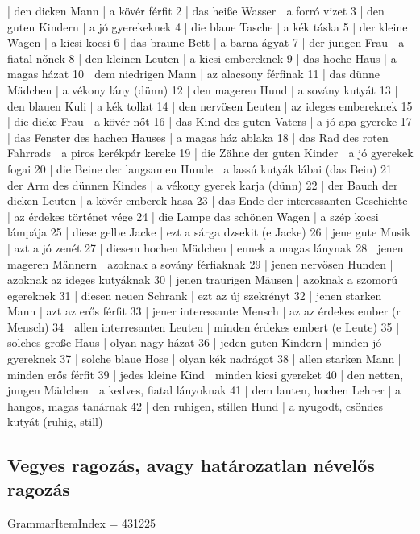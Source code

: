 \documentclass{article}
\newenvironment{desc}{\verbatim}{\endverbatim}
\newenvironment{exmp}{\verbatim}{\endverbatim}
\begin{document}
\begin{exmp}
1 | den dicken Mann | a kövér férfit
2 | das heiße Wasser | a forró vizet
3 | den guten Kindern | a jó gyerekeknek
4 | die blaue Tasche | a kék táska
5 | der kleine Wagen | a kicsi kocsi
6 | das braune Bett | a barna ágyat
7 | der jungen Frau | a fiatal nőnek
8 | den kleinen Leuten | a kicsi embereknek
9 | das hoche Haus | a magas házat
10 | dem niedrigen Mann | az alacsony férfinak
11 | das dünne Mädchen | a vékony lány (dünn)
12 | den mageren Hund | a sovány kutyát
13 | den blauen Kuli | a kék tollat
14 | den nervösen Leuten | az ideges embereknek
15 | die dicke Frau | a kövér nőt
16 | das Kind des guten Vaters | a jó apa gyereke
17 | das Fenster des hachen Hauses | a magas ház ablaka
18 | das Rad des roten Fahrrads | a piros kerékpár kereke
19 | die Zähne der guten Kinder | a jó gyerekek fogai
20 | die Beine der langsamen Hunde | a lassú kutyák lábai (das Bein)
21 | der Arm des dünnen Kindes | a vékony gyerek karja (dünn)
22 | der Bauch der dicken Leuten | a kövér emberek hasa
23 | das Ende der interessanten Geschichte | az érdekes történet vége
24 | die Lampe das schönen Wagen | a szép kocsi lámpája
25 | diese gelbe Jacke | ezt a sárga dzsekit (e Jacke)
26 | jene gute Musik | azt a jó zenét
27 | diesem hochen Mädchen | ennek a magas lánynak
28 | jenen mageren Männern | azoknak a sovány férfiaknak
29 | jenen nervösen Hunden | azoknak az ideges kutyáknak
30 | jenen traurigen Mäusen | azoknak a szomorú egereknek
31 | diesen neuen Schrank | ezt az új szekrényt
32 | jenen starken Mann | azt az erős férfit
33 | jener interessante Mensch | az az érdekes ember (r Mensch)
34 | allen interresanten Leuten | minden érdekes embert (e Leute)
35 | solches große Haus | olyan nagy házat
36 | jeden guten Kindern | minden jó gyereknek
37 | solche blaue Hose | olyan kék nadrágot
38 | allen starken Mann | minden erős férfit
39 | jedes kleine Kind | minden kicsi gyereket
40 | den netten, jungen Mädchen | a kedves, fiatal lányoknak
41 | dem lauten, hochen Lehrer | a hangos, magas tanárnak
42 | den ruhigen, stillen Hund | a nyugodt, csöndes kutyát (ruhig, still)
\end{exmp}

\subsection{Vegyes ragozás, avagy határozatlan névelős ragozás}

GrammarItemIndex = 431225

\begin{desc}
\end{desc}
\end{document}
